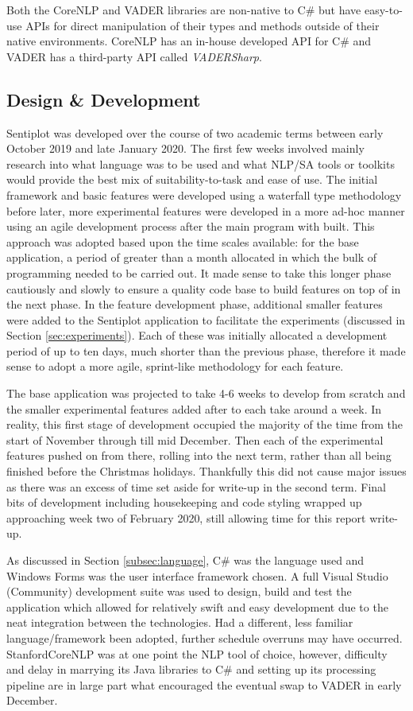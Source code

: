 \documentclass{article}
\begin{document}
{        Both the CoreNLP and VADER libraries are non-native to C\# but have easy-to-use APIs for direct manipulation of their types and methods outside of their native environments. CoreNLP has an in-house developed API for C\# and VADER has a third-party API called \textit{VADERSharp}.
    \subsection{Design \& Development}
    \label{subsec:dnd}
        Sentiplot was developed over the course of two academic terms between early October 2019 and late January 2020. The first few weeks involved mainly research into what language was to be used and what NLP/SA tools or toolkits would provide the best mix of suitability-to-task and ease of use. The initial framework and basic features were developed using a waterfall type methodology before later, more experimental features were developed in a more ad-hoc manner using an agile development process after the main program with built. This approach was adopted based upon the time scales available: for the base application, a period of greater than a month allocated in which the bulk of programming needed to be carried out. It made sense to take this longer phase cautiously and slowly to ensure a quality code base to build features on top of in the next phase. In the feature development phase, additional smaller features were added to the Sentiplot application to facilitate the experiments (discussed in Section \ref{sec:experiments}). Each of these was initially allocated a development period of up to ten days, much shorter than the previous phase, therefore it made sense to adopt a more agile, sprint-like methodology for each feature.
        
        The base application was projected to take 4-6 weeks to develop from scratch and the smaller experimental features added after to each take around a week. In reality, this first stage of development occupied the majority of the time from the start of November through till mid December. Then each of the experimental features pushed on from there, rolling into the next term, rather than all being finished before the Christmas holidays. Thankfully this did not cause major issues as there was an excess of time set aside for write-up in the second term. Final bits of development including housekeeping and code styling wrapped up approaching week two of February 2020, still allowing time for this report write-up.

        As discussed in Section \ref{subsec:language}, C\# was the language used and Windows Forms was the user interface framework chosen. A full Visual Studio (Community) development suite was used to design, build and test the application which allowed for relatively swift and easy development due to the neat integration between the technologies. Had a different, less familiar language/framework been adopted, further schedule overruns may have occurred. StanfordCoreNLP was at one point the NLP tool of choice, however, difficulty and delay in marrying its Java libraries to C\# and setting up its processing pipeline are in large part what encouraged the eventual swap to VADER in early December.
        
}
\end{document}
